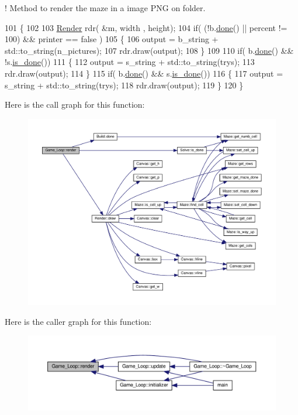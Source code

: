 ! Method to render the maze in a image P\+NG on folder. 


\begin{DoxyCode}
101 \{
102 
103     \hyperlink{classRender}{Render} rdr( &m, width , height);
104     \textcolor{keywordflow}{if}( (!b.\hyperlink{classBuild_a72373ff38b0676c8f2c9f171c15333c4}{done}() || percent != 100) && printer == \textcolor{keyword}{false}  )
105     \{   
106             output = b\_string + std::to\_string(n\_pictures);
107             rdr.draw(output);
108     \}
109 
110     \textcolor{keywordflow}{if}( b.\hyperlink{classBuild_a72373ff38b0676c8f2c9f171c15333c4}{done}() && !s.\hyperlink{classSolve_a868db181d288fdb10e5592b62e669c3b}{is\_done}())
111     \{
112         output = s\_string + std::to\_string(trys);
113         rdr.draw(output);
114     \}
115     \textcolor{keywordflow}{if}( b.\hyperlink{classBuild_a72373ff38b0676c8f2c9f171c15333c4}{done}() && s.\hyperlink{classSolve_a868db181d288fdb10e5592b62e669c3b}{is\_done}())
116     \{
117         output = s\_string + std::to\_string(trys);
118         rdr.draw(output);
119     \}
120 \}
\end{DoxyCode}
Here is the call graph for this function\+:\nopagebreak
\begin{figure}[H]
\begin{center}
\leavevmode
\includegraphics[width=350pt]{classGame__Loop_a5048bf3b3b18b529fe1e4a474282f274_cgraph}
\end{center}
\end{figure}
Here is the caller graph for this function\+:\nopagebreak
\begin{figure}[H]
\begin{center}
\leavevmode
\includegraphics[width=350pt]{classGame__Loop_a5048bf3b3b18b529fe1e4a474282f274_icgraph}
\end{center}
\end{figure}
